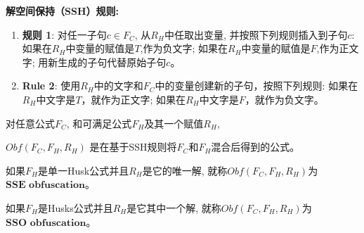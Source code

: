\textbf{解空间保持（SSH）规则: }
\begin{enumerate}
\item \textbf{规则 1}:
对任一子句$c\in F_{C}$,
从$R_H$中任取出变量,
并按照下列规则插入到子句$c$:
如果在$R_H$中变量的赋值是$T$,作为负文字;
如果在$R_H$中变量的赋值是$F$,作为正文字;
用新生成的子句代替原始子句$c$。
\item \textbf{Rule 2}:
使用$R_H$中的文字和$F_C$中的变量创建新的子句，按照下列规则:
如果在$R_H$中文字是$T$，就作为正文字;
如果在$R_H$中文字是$F$，就作为负文字。
\end{enumerate}
%

\begin{definition}\label{OBFUSCATORSSH}
对任意公式$F_C$, 和可满足公式$F_H$及其一个赋值$R_H$,

$Obf(F_C,F_H,R_H)$ 是在基于SSH规则将$F_C$和$F_H$混合后得到的公式。

如果$F_H$是单一Husk公式并且$R_H$是它的唯一解, 就称$Obf(F_C,F_H,R_H)$为${\textbf{SSE obfuscation}}$。

如果$F_H$是Husks公式并且$R_H$是它其中一个解, 就称$Obf(F_C,F_H,R_H)$为${\textbf{SSO obfuscation}}$。
\end{definition}

